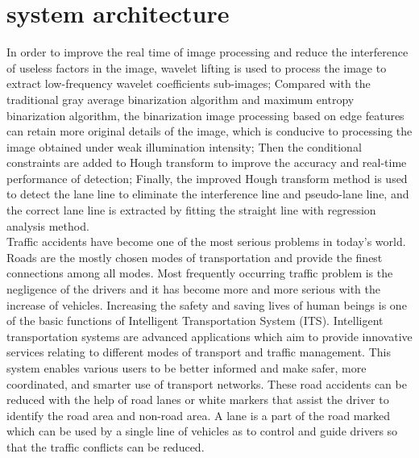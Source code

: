 \documentclass[oneside,a4paper,12pt]{report}
\begin{document}
\section{system architecture}
\hspace*{0.3 in} In order to improve the real time of image processing and reduce the interference of useless factors in the image, wavelet lifting is used to process the image to extract low-frequency wavelet coefficients sub-images; Compared with the traditional gray average binarization algorithm and maximum entropy binarization algorithm, the binarization image processing based on edge features can retain more original details of the image, which is conducive to processing the image obtained under weak illumination intensity; Then the conditional constraints are added to Hough transform to improve the accuracy and real-time performance of detection; Finally, the improved Hough transform method is used to detect the lane line to eliminate the interference line and pseudo-lane line, and the correct lane line is extracted by fitting the straight line with regression analysis method. \\
\hspace*{0.3 in} Traffic accidents have become one of the most serious problems in today’s world. Roads are the mostly chosen modes of transportation and provide the finest connections among all modes. Most frequently occurring traffic problem is the negligence of the drivers and it has become more and more serious with the increase of vehicles. Increasing the safety and saving lives of human beings is one of the basic functions of Intelligent Transportation System (ITS). Intelligent transportation systems are advanced applications which aim to provide innovative services relating to different modes of transport and traffic management. This system enables various users to be better informed and make safer, more coordinated, and smarter use of transport networks. These road accidents can be reduced with the help of road lanes or white markers that assist the driver to identify the road area and non-road area. A lane is a part of the road marked which can be used by a single line of vehicles as to control and guide drivers so that the traffic conflicts can be reduced.
 \\
\end{document}
